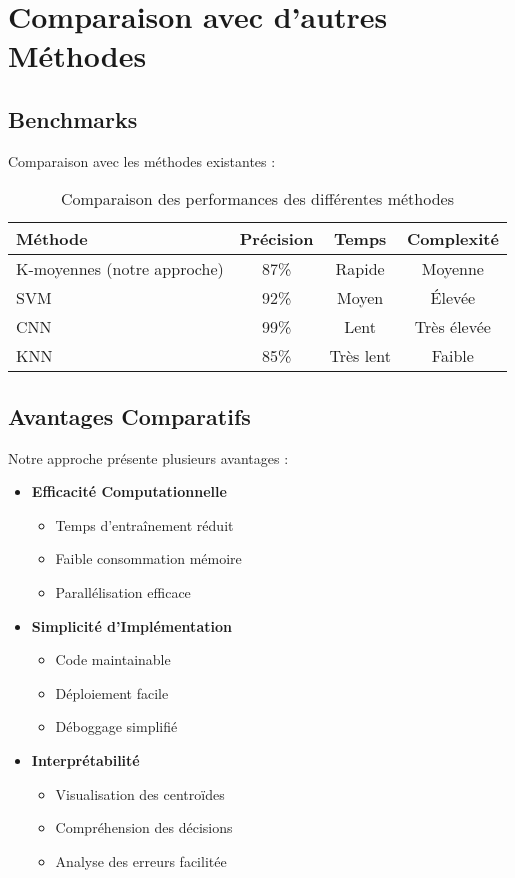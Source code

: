 \section{Comparaison avec d'autres Méthodes}

\subsection{Benchmarks}
Comparaison avec les méthodes existantes :

\begin{table}[h]
\centering
\begin{tabular}{|l|c|c|c|}
\hline
\textbf{Méthode} & \textbf{Précision} & \textbf{Temps} & \textbf{Complexité} \\
\hline
K-moyennes (notre approche) & 87\% & Rapide & Moyenne \\
SVM & 92\% & Moyen & Élevée \\
CNN & 99\% & Lent & Très élevée \\
KNN & 85\% & Très lent & Faible \\
\hline
\end{tabular}
\caption{Comparaison des performances des différentes méthodes}
\end{table}

\subsection{Avantages Comparatifs}
Notre approche présente plusieurs avantages :

\begin{itemize}
    \item \textbf{Efficacité Computationnelle}
    \begin{itemize}
        \item Temps d'entraînement réduit
        \item Faible consommation mémoire
        \item Parallélisation efficace
    \end{itemize}

    \item \textbf{Simplicité d'Implémentation}
    \begin{itemize}
        \item Code maintainable
        \item Déploiement facile
        \item Déboggage simplifié
    \end{itemize}

    \item \textbf{Interprétabilité}
    \begin{itemize}
        \item Visualisation des centroïdes
        \item Compréhension des décisions
        \item Analyse des erreurs facilitée
    \end{itemize}
\end{itemize}

